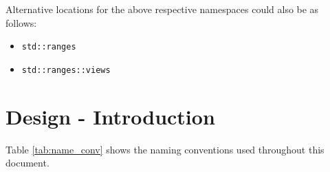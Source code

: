 \documentclass[10pt,onecolumn]{article}
\newcommand{\tcode}[1]{\lstinline[breaklines=true]{#1}}
\begin{document}
\noindent
Alternative locations for the above respective namespaces could also be as follows:
\begin{itemize}
\item[]\tcode{std::ranges}
\item[]\tcode{std::ranges::views}
\end{itemize}



\section{Design - Introduction}

Table \ref{tab:name_conv} shows the naming conventions used throughout this document. 
\end{document}
